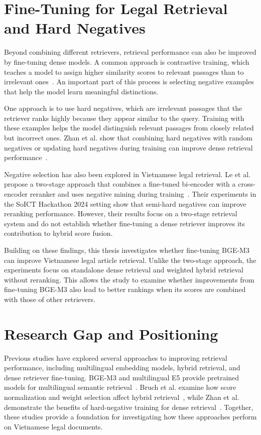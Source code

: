 \section{Fine-Tuning for Legal Retrieval and Hard Negatives}

Beyond combining different retrievers, retrieval performance can also be improved by fine-tuning dense models. A common approach is contrastive training, which teaches a model to assign higher similarity scores to relevant passages than to irrelevant ones~\cite{karpukhin2020}. An important part of this process is selecting negative examples that help the model learn meaningful distinctions.

One approach is to use hard negatives, which are irrelevant passages that the retriever ranks highly because they appear similar to the query. Training with these examples helps the model distinguish relevant passages from closely related but incorrect ones. Zhan et al. show that combining hard negatives with random negatives or updating hard negatives during training can improve dense retrieval performance~\cite{zhan2021}.

Negative selection has also been explored in Vietnamese legal retrieval. Le et al. propose a two-stage approach that combines a fine-tuned bi-encoder with a cross-encoder reranker and uses negative mining during training~\cite{le2025semihard}. Their experiments in the SoICT Hackathon 2024 setting show that semi-hard negatives can improve reranking performance. However, their results focus on a two-stage retrieval system and do not establish whether fine-tuning a dense retriever improves its contribution to hybrid score fusion.

Building on these findings, this thesis investigates whether fine-tuning BGE-M3 can improve Vietnamese legal article retrieval. Unlike the two-stage approach, the experiments focus on standalone dense retrieval and weighted hybrid retrieval without reranking. This allows the study to examine whether improvements from fine-tuning BGE-M3 also lead to better rankings when its scores are combined with those of other retrievers.

\section{Research Gap and Positioning}
Previous studies have explored several approaches to improving retrieval performance, including multilingual embedding models, hybrid retrieval, and dense retriever fine-tuning. BGE-M3 and multilingual E5 provide pretrained models for multilingual semantic retrieval~\cite{chen2024,wang2024}. Bruch et al. examine how score normalization and weight selection affect hybrid retrieval~\cite{bruch2022}, while Zhan et al. demonstrate the benefits of hard-negative training for dense retrieval~\cite{zhan2021}. Together, these studies provide a foundation for investigating how these approaches perform on Vietnamese legal documents.

